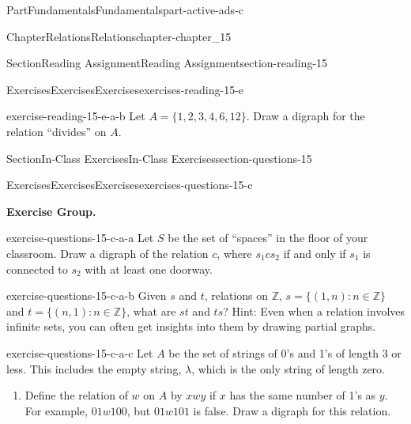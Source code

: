\documentclass[oneside,10pt,]{book}
\numberwithin{equation}{section}
\begin{document}
\begin{partptx}{Part}{Fundamentals}{}{Fundamentals}{}{}{part-active-ads-c}
\begin{chapterptx}{Chapter}{Relations}{}{Relations}{}{}{chapter-chapter_15}
\begin{sectionptx}{Section}{Reading Assignment}{}{Reading Assignment}{}{}{section-reading-15}
\begin{exercises-subsection-numberless}{Exercises}{Exercises}{}{Exercises}{}{}{exercises-reading-15-e}
\begin{exercisegroup}
\begin{divisionexerciseeg}{2}{}{}{exercise-reading-15-e-a-b}%
Let \(A = \{1,2,3,4,6,12\}\).  Draw a digraph for the relation ``divides'' on \(A\).%
\end{divisionexerciseeg}%
\end{exercisegroup}
\par\medskip\noindent
\end{exercises-subsection-numberless}
\end{sectionptx}
%
%
\typeout{************************************************}
\typeout{************************************************}
%
\begin{sectionptx}{Section}{In-Class Exercises}{}{In-Class Exercises}{}{}{section-questions-15}
%
%
%
\typeout{************************************************}
\typeout{************************************************}
%
\begin{exercises-subsection-numberless}{Exercises}{Exercises}{}{Exercises}{}{}{exercises-questions-15-c}
\par\medskip\noindent%
\textbf{Exercise Group.}\space\space%
\begin{exercisegroup}
\begin{divisionexerciseeg}{1}{}{}{exercise-questions-15-c-a-a}%
Let \(S\) be the set of ``spaces'' in the floor of your classroom.   Draw a digraph of the relation \(c\), where \(s_1 c s_2\) if and only if \(s_1\) is connected to \(s_2\) with at least one doorway.%
\end{divisionexerciseeg}%
\begin{divisionexerciseeg}{2}{}{}{exercise-questions-15-c-a-b}%
Given \(s\) and \(t\), relations on \(\mathbb{Z}\), \(s = \{(1, n) : n \in \mathbb{Z}\}\) and \(t= \{(n, 1) : n \in  \mathbb{Z}\}\), what are \(st\) and \(ts\)? Hint: Even when a relation involves infinite sets, you can often get insights into them by drawing partial graphs.%
\end{divisionexerciseeg}%
\begin{divisionexerciseeg}{3}{}{}{exercise-questions-15-c-a-c}%
Let \(A\) be the set of strings of 0's and 1's of length 3 or less.  This includes the empty string, \(\lambda\), which is the only string of length zero.%
\begin{enumerate}[label=(\alph*)]
\item{}Define the relation of \(w\) on \(A\) by \(x w y\) if \(x\) has the same number of 1's as \(y\). For example, \(01 w 100\), but \(01 w 101\) is false. Draw a digraph for this relation.%

\end{enumerate}
\end{divisionexerciseeg}
\end{exercisegroup}
\end{exercises-subsection-numberless}
\end{sectionptx}
\end{chapterptx}
\end{partptx}
\end{document}
